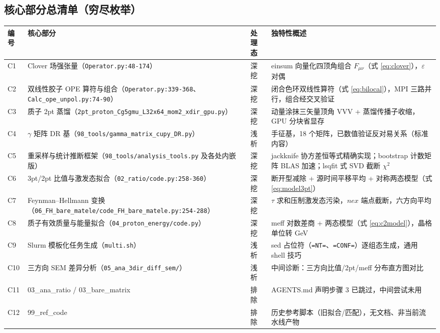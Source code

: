 \documentclass[UTF8]{ctexart}
\begin{document}
\subsection{核心部分总清单（穷尽枚举）}

\begin{xltabular}{\textwidth}{lXlX}
\toprule
\textcolor{algo}{编号} & 核心部分 & 处理态 & 独特性概述 \\
\midrule
\endhead
C1 & Clover 场强张量（\texttt{\nolinkurl{Operator.py:48-174}}） & 深挖 &
einsum 向量化四顶角组合 $F_{\mu\nu}$（式 \eqref{eq:clover}），$\varepsilon$ 对偶 \\
C2 & 双线性胶子 OPE 算符与组合（\texttt{\nolinkurl{Operator.py:339-368}}、
\texttt{\nolinkurl{Calc_ope_unpol.py:74-90}}） & 深挖 &
闭合色环双线性算符（式 \eqref{eq:bilocal}），MPI 三路并行，组合经交叉验证 \\
C3 & 质子 2pt 蒸馏（\texttt{\nolinkurl{2pt_proton_Cg5gmu_L32x64_mom2_xdir_gpu.py}}） & 深挖 &
动量涂抹三矢量顶角 VVV + 蒸馏传播子收缩，GPU 分块省显存 \\
C4 & $\gamma$ 矩阵 DR 基（\texttt{\nolinkurl{98_tools/gamma_matrix_cupy_DR.py}}） & 浅析 &
手征基，18 个矩阵，已数值验证反对易关系（标准内容） \\
C5 & 重采样与统计推断框架（\texttt{\nolinkurl{98_tools/analysis_tools.py}} 及各处内嵌版） & 深挖 &
jackknife 协方差恒等式精确实现；bootstrap 计数矩阵 BLAS 加速；lsqfit 式 SVD 截断 $\chi^2$ \\
C6 & 3pt/2pt 比值与激发态拟合（\texttt{\nolinkurl{02_ratio/code.py:258-360}}） & 深挖 &
断开型减除 + 源时间平移平均 + 对称两态模型（式 \eqref{eq:model3pt}） \\
C7 & Feynman--Hellmann 变换（\texttt{\nolinkurl{06_FH_bare_matele/code_FH_bare_matele.py:254-288}}） & 深挖 &
$\tau$ 求和压制激发态污染，$nex$ 端点截断，六方向平均 \\
C8 & 质子有效质量与能量拟合（\texttt{\nolinkurl{04_proton_energy/code.py}}） & 深挖 &
meff 对数差商 + 两态模型（式 \eqref{eq:c2model}），晶格单位转 GeV \\
C9 & Slurm 模板化任务生成（\texttt{\nolinkurl{multi.sh}}） & 浅析 &
sed 占位符（\texttt{=NT=}、\texttt{=CONF=}）逐组态生成，通用 shell 技巧 \\
C10 & 三方向 SEM 差异分析（\texttt{\nolinkurl{05_ana_3dir_diff_sem/}}） & 浅析 &
中间诊断：三方向比值/2pt/meff 分布直方图对比 \\
C11 & 03\_ana\_ratio / 03\_bare\_matrix & 排除 & AGENTS.md 声明步骤 3 已跳过，中间尝试未用 \\
C12 & 99\_ref\_code & 排除 & 历史参考脚本（旧拟合/匹配），无文档、非当前流水线产物 \\
\bottomrule
\end{xltabular}
\end{document}
